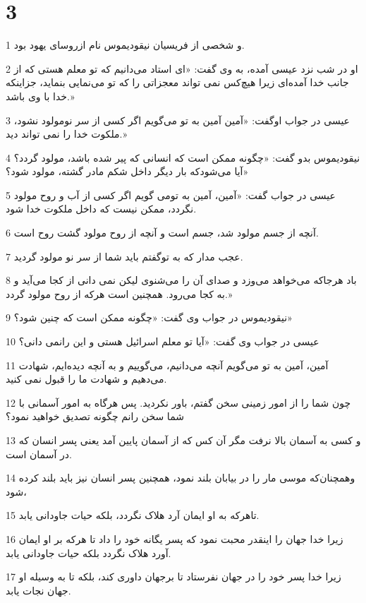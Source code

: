 \chapter{3}

\par 1 و شخصی از فریسیان نیقودیموس نام ازروسای یهود بود.
\par 2 او در شب نزد عیسی آمده، به وی گفت: «ای استاد می‌دانیم که تو معلم هستی که از جانب خدا آمده‌ای زیرا هیچ‌کس نمی تواند معجزاتی را که تو می‌نمایی بنماید، جزاینکه خدا با وی باشد.»
\par 3 عیسی در جواب اوگفت: «آمین آمین به تو می‌گویم اگر کسی از سر نومولود نشود، ملکوت خدا را نمی تواند دید.»
\par 4 نیقودیموس بدو گفت: «چگونه ممکن است که انسانی که پیر شده باشد، مولود گردد؟ آیا می‌شودکه بار دیگر داخل شکم مادر گشته، مولود شود؟»
\par 5 عیسی در جواب گفت: «آمین، آمین به تومی گویم اگر کسی از آب و روح مولود نگردد، ممکن نیست که داخل ملکوت خدا شود.
\par 6 آنچه از جسم مولود شد، جسم است و آنچه از روح مولود گشت روح است.
\par 7 عجب مدار که به توگفتم باید شما از سر نو مولود گردید.
\par 8 باد هرجاکه می‌خواهد می‌وزد و صدای آن را می‌شنوی لیکن نمی دانی از کجا می‌آید و به کجا می‌رود. همچنین است هر‌که از روح مولود گردد.»
\par 9 نیقودیموس در جواب وی گفت: «چگونه ممکن است که چنین شود؟»
\par 10 عیسی در جواب وی گفت: «آیا تو معلم اسرائیل هستی و این رانمی دانی؟
\par 11 آمین، آمین به تو می‌گویم آنچه می‌دانیم، می‌گوییم و به آنچه دیده‌ایم، شهادت می‌دهیم و شهادت ما را قبول نمی کنید.
\par 12 چون شما را از امور زمینی سخن گفتم، باور نکردید. پس هرگاه به امور آسمانی با شما سخن رانم چگونه تصدیق خواهید نمود؟
\par 13 و کسی به آسمان بالا نرفت مگر آن کس که از آسمان پایین آمد یعنی پسر انسان که در آسمان است.
\par 14 وهمچنان‌که موسی مار را در بیابان بلند نمود، همچنین پسر انسان نیز باید بلند کرده شود،
\par 15 تاهر‌که به او ایمان آرد هلاک نگردد، بلکه حیات جاودانی یابد.
\par 16 زیرا خدا جهان را اینقدر محبت نمود که پسر یگانه خود را داد تا هر‌که بر او ایمان آورد هلاک نگردد بلکه حیات جاودانی یابد.
\par 17 زیرا خدا پسر خود را در جهان نفرستاد تا برجهان داوری کند، بلکه تا به وسیله او جهان نجات یابد.
